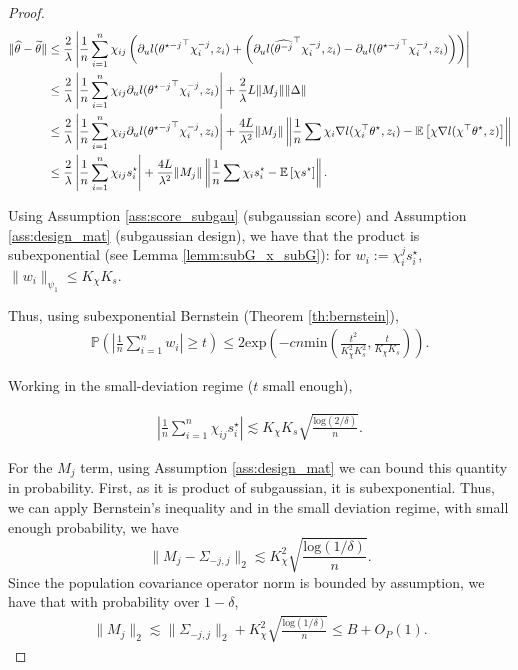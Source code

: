 \documentclass{article}
\theoremstyle{plain}
\theoremstyle{definition}
\theoremstyle{remark}
\newcommand{\e}[1]{\mathbb{E}\left[#1\right]  } %
\newcommand{\prob}[1]{\mathbb{P}\left(#1\right)} %
\begin{document}
\begin{proof}
\begin{align}\notag
    \|\widehat{\theta}-\widetilde{\theta}\|&\leq \frac{2}{\lambda}\left|\frac{1}{n}\sum_{i=1}^n \chi_{ij}\left(\partial_u l({\theta^{\star -j}}^\top \chi_i^{-j}, z_i)+\left(\partial_u l(\widehat{\theta^{-j}}^\top \chi_i^{-j}, z_i)-\partial_u l({\theta^{\star -j}}^\top \chi_i^{-j}, z_i)\right)\right)\right|\\\notag
    &\leq \frac{2}{\lambda}\left|\frac{1}{n}\sum_{i=1}^n \chi_{ij}\partial_u l({\theta^{\star -j}}^\top \chi_i^{-j}, z_i)\right|+\frac{2}{\lambda}L\|M_j\| \|\Delta\|\\\notag
    &\leq \frac{2}{\lambda}\left|\frac{1}{n}\sum_{i=1}^n \chi_{ij}\partial_u l({\theta^{\star -j}}^\top \chi_i^{-j}, z_i)\right|+\frac{4L}{\lambda^2}\|M_j\| \left\|\frac{1}{n}\sum \chi_i\nabla l (\chi_i^\top \theta^\star, z_i)-\e{\chi\nabla l(\chi^\top \theta^\star, z)}\right\|\\\label{eq:theta_stab}
    &\leq \frac{2}{\lambda}\left|\frac{1}{n}\sum_{i=1}^n \chi_{ij}s_i^\star\right|+\frac{4L}{\lambda^2}\|M_j\| \left\|\frac{1}{n}\sum \chi_i s_i^\star-\e{\chi s^\star}\right\|.
\end{align}

Using Assumption \ref{ass:score_subgau} (subgaussian score) and Assumption \ref{ass:design_mat} (subgaussian design), we have that the product is subexponential (see Lemma \ref{lemm:subG_x_subG}): for $w_i:=\chi_{i}^j s_i^\star$, $\|w_i\|_{\psi_1}\leq K_\chi K_s$.

Thus, using subexponential Bernstein (Theorem \ref{th:bernstein}), 
\begin{align*}
    \prob{\left|\frac{1}{n}\sum_{i=1}^n w_i\right|\geq t}\leq 2\mathrm{exp}\left(-cn\mathrm{min}\left(\frac{t^2}{K_\chi^2 K_s^2}, \frac{t}{K_\chi K_s}\right)\right).
\end{align*}

Working in the small-deviation regime ($t$ small enough), 

\begin{align}
    \left|\frac{1}{n}\sum_{i=1}^n \chi_{ij}s_i^\star\right| \lesssim K_\chi K_s\sqrt{\frac{\mathrm{log}(2/\delta)}{n}}. \label{eq:chi_stab}
\end{align}


For the $M_j$ term, using Assumption \ref{ass:design_mat} we can bound this quantity in probability. First, as it is product of subgaussian, it is subexponential. Thus, we can apply Bernstein's inequality and in the small deviation regime, with small enough probability, we have $$\|M_j-\Sigma_{-j, j}\|_2\lesssim K_\chi^2\sqrt{\frac{\mathrm{log}(1/\delta)}{n}}.$$Since the population covariance operator norm is bounded by assumption, we have that with probability over $1-\delta$,
\begin{align}
    \|M_j\|_2\lesssim \|\Sigma_{-j, j}\|_2 +K_\chi^2\sqrt{\frac{\mathrm{log}(1/\delta)}{n}}\leq B+O_P(1).\label{eq:m_stab}
\end{align}


\end{proof}
\end{document}
